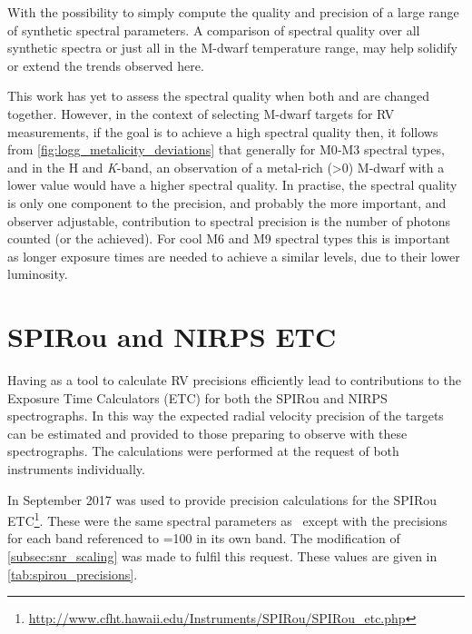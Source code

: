 With the possibility to simply compute the quality and precision of a large range of synthetic spectral parameters. A comparison of spectral quality over all synthetic spectra or just all in the M-dwarf temperature range, may help solidify or extend the trends observed here.

This work has yet to assess the spectral quality when both \feh{} and \Logg{} are changed together.
{\red{}However, in the context of selecting M-dwarf targets for RV measurements, if the goal is to achieve a high spectral quality then, it follows from \cref{fig:logg_metalicity_deviations} that generally for {M0}-M3 spectral types, and in the H and \emph{K}-band, an observation of a metal-rich (\feh{}>0) M-dwarf with a lower \Logg{} value would have a higher spectral quality.
In practise, the spectral quality is only one component to the precision, and probably the  more important, and observer adjustable,  contribution to spectral precision is the number of photons counted (or the \snr{} achieved).
For cool {M6} and {M9} spectral types this is important as longer exposure times are needed to achieve a similar \snr{} levels, due to their lower luminosity.}


\section{{SPIRou} and {NIRPS} {ETC}}
\label{sec:spirou_nirps_etc}
Having \eniric{} as a tool to calculate {RV} precisions efficiently lead to contributions to the Exposure Time Calculators (ETC) for both the {SPIRou} and {NIRPS} spectrographs.
In this way the expected radial velocity precision of the targets can be estimated and provided to those preparing to observe with these spectrographs.
The calculations were performed at the request of both instruments individually.

In September 2017 \eniric{} was used to provide precision calculations for the {SPIRou} ETC\footnote{\url{http://www.cfht.hawaii.edu/Instruments/SPIRou/SPIRou_etc.php}}.
These were the same spectral parameters as~\citet{figueira_radial_2016} except with the precisions for each band referenced to {\snr{}=100} in its own band.
The modification of \cref{subsec:snr_scaling} was made to fulfil this request. These values are given in \cref{tab:spirou_precisions}.

